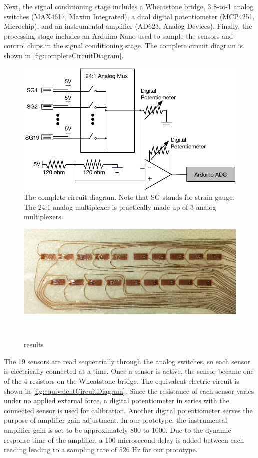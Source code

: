 \documentclass{sigchi}
\begin{document}
Next, the signal conditioning stage includes a Wheatstone bridge, 3 8-to-1 analog switches (MAX4617, Maxim Integrated), a dual digital potentiometer (MCP4251, Microchip), and an instrumental amplifier (AD623, Analog Devices). Finally, the processing stage includes an Arduino Nano used to sample the sensors and control chips in the signal conditioning stage. The complete circuit diagram is shown in \autoref{fig:completeCircuitDiagram}.

\begin{figure}
  \includegraphics[width=1\columnwidth]{figures/CompleteDiagram_v2.pdf}
  \caption{The complete circuit diagram. Note that SG stands for strain gauge. The 24:1 analog multiplexer is practically made up of 3 analog multiplexers.}
  \label{fig:completeCircuitDiagram}
\end{figure}

\begin{figure}
 \begin{center}
  \includegraphics[width=1\columnwidth]{figures/tie.png}
  \caption{
    results
  }~\label{fig:tie}
  \end{center}
\end{figure}

The 19 sensors are read sequentially through the analog switches, so each sensor is electrically connected at a time. Once a sensor is active, the sensor became one of the 4 resistors on the Wheatstone bridge. The equivalent electric circuit is shown in \autoref{fig:equivalentCircuitDiagram}. Since the resistance of each sensor varies under no applied external force, a digital potentiometer in series with the connected sensor is used for calibration. Another digital potentiometer serves the purpose of amplifier gain adjustment. In our prototype, the instrumental amplifier gain is set to be approximately 800 to 1000. Due to the dynamic response time of the amplifier, a 100-microsecond delay is added between each reading leading to a sampling rate of 526 Hz for our prototype.
\end{document}
